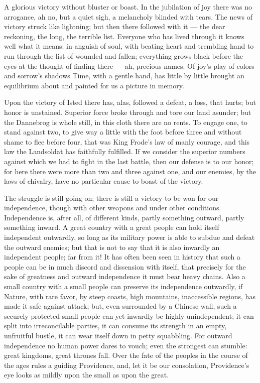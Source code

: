 \documentclass[12pt,a4paper,openany]{book}
\newcommand{\opage}[1]{\marginnote{\footnotesize\textit{[#1]}}}
\begin{document}
A glorious victory without bluster or boast. In the jubilation of
joy there was no arrogance, ah no, but a quiet sigh, a
melancholy blinded with tears. The news of victory struck like
lightning; but then there followed with it --- the dear reckoning,
the long, the terrible list. Everyone who has
lived through it knows well what it means: in anguish of soul,
with beating heart and trembling hand to run through
the list of wounded and fallen; everything grows black
before the eyes at the thought of finding there --- ah, precious
names. Of joy's play of colors and sorrow's shadows
Time, with a gentle hand, has little by little brought an equilibrium
about and painted for us a picture in memory.

Upon the victory of Isted there has, alas, followed a defeat, a
loss, that hurts; but honor is unstained. Superior force
broke through and tore our land asunder; but the Dannebrog
is whole still, in this cloth there are no rents. To
engage one, to stand against two, to give way a little
with the foot before three and without shame to flee before %
four, that was
King Frode's law of manly courage, and this law the
Landsoldat has faithfully fulfilled. If we consider the superior numbers
against which we had to fight in the last battle, then
our defense is to our honor; for here there were more than
two and three against one, and our enemies, by the
laws of chivalry, have no particular cause to boast of the victory.

The struggle is still going on; there is still a
victory to be won for our independence, though with other
weapons and under other conditions. Independence
is, after all, of different kinds, partly something outward, partly something
inward. A great country with a great people can hold
\setcounter{footnote}{0}%
\opage{158}itself independent outwardly, so long as its military power
is able to subdue and defeat the outward enemies; but
that is not to say that it is also inwardly an
independent people; far from it! It has often been seen in history
that such a people can be in much discord and
dissension with itself, that precisely for the sake of greatness and
outward independence it must bear heavy chains.
Also a small country with a small people can preserve its
independence outwardly, if Nature, with rare
favor, by steep coasts, high mountains, inaccessible regions,
has made it safe against attack; but, even surrounded by
a Chinese wall, such a securely protected small people can yet
inwardly be highly unindependent; it can split into
irreconcilable parties, it can consume its strength in an empty,
unfruitful bustle, it can wear itself down in petty
squabbling. For outward independence no
human power dares to vouch; even the strongest can
stumble: great kingdoms, great thrones fall. Over the
fate of the peoples in the course of the ages rules a guiding Providence, and,
let it be our consolation, Providence's eye looks as mildly
upon the small as upon the great.
\end{document}

